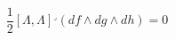 \begin{equation}\label{eq60:ps}
\frac{1}{2}[\Lambda,\Lambda]^{\lrcorner}(df\wedge dg\wedge dh)=0
\end{equation}

